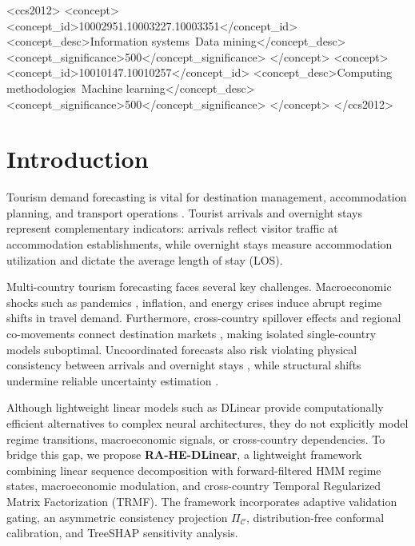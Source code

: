 \documentclass[sigconf]{acmart}
\begin{document}
\begin{CCSXML}
<ccs2012>
   <concept>
       <concept_id>10002951.10003227.10003351</concept_id>
       <concept_desc>Information systems~Data mining</concept_desc>
       <concept_significance>500</concept_significance>
   </concept>
   <concept>
       <concept_id>10010147.10010257</concept_id>
       <concept_desc>Computing methodologies~Machine learning</concept_desc>
       <concept_significance>500</concept_significance>
   </concept>
</ccs2012>
\end{CCSXML}



\maketitle

\section{Introduction}
Tourism demand forecasting is vital for destination management, accommodation planning, and transport operations \cite{song2019tourism,clements1998forecasting}. Tourist arrivals and overnight stays represent complementary indicators: arrivals reflect visitor traffic at accommodation establishments, while overnight stays measure accommodation utilization and dictate the average length of stay (LOS).

Multi-country tourism forecasting faces several key challenges. Macroeconomic shocks such as pandemics \cite{gossling2020pandemics}, inflation, and energy crises induce abrupt regime shifts in travel demand. Furthermore, cross-country spillover effects and regional co-movements connect destination markets \cite{yang2019spatial,cang2014comparative}, making isolated single-country models suboptimal. Uncoordinated forecasts also risk violating physical consistency between arrivals and overnight stays \cite{kourentzes2019coherent}, while structural shifts undermine reliable uncertainty estimation \cite{barber2023conformal,gibbs2021adaptive}.

Although lightweight linear models such as DLinear \cite{zeng2023dlinear} provide computationally efficient alternatives to complex neural architectures, they do not explicitly model regime transitions, macroeconomic signals, or cross-country dependencies. To bridge this gap, we propose \textbf{RA-HE-DLinear}, a lightweight framework combining linear sequence decomposition with forward-filtered HMM regime states, macroeconomic modulation, and cross-country Temporal Regularized Matrix Factorization (TRMF). The framework incorporates adaptive validation gating, an asymmetric consistency projection $\Pi_{\mathcal{C}}$, distribution-free conformal calibration, and TreeSHAP sensitivity analysis.
\end{document}
